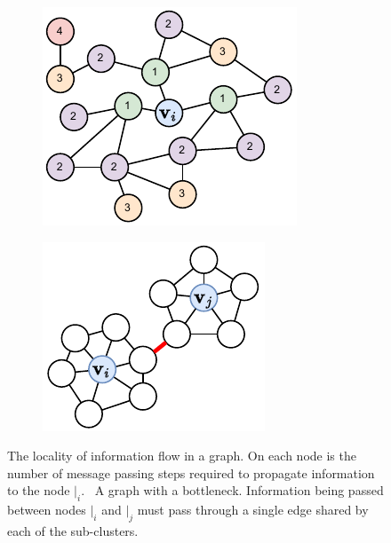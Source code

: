 \begin{figure}
    \centering
    \begin{subfigure}[b]{0.3\textwidth}
        \centering
        \includegraphics[width=\textwidth]{Figures/transformers/neighbours.pdf}
        \caption{}
        \label{fig:neighbours}
    \end{subfigure}
    \begin{subfigure}[b]{0.3\textwidth}
        \centering
        \includegraphics[width=\textwidth]{Figures/transformers/bottleneck.pdf}
        \caption{}
        \label{fig:bottleneck}
    \end{subfigure}
    \caption{ The locality of information flow in a graph. On each node is the number of message passing steps required to propagate information to the node $\vert_i$.\  A graph with a bottleneck. Information being passed between nodes $\vert_i$ and $\vert_j$ must pass through a single edge shared by each of the sub-clusters.}
    \label{fig:over_squashing}
\end{figure}

